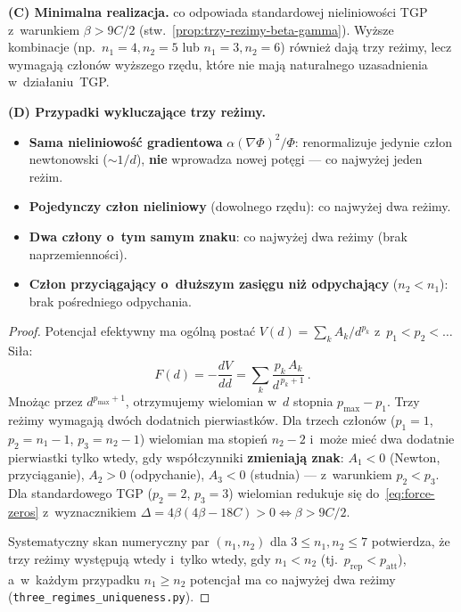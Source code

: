 \begin{theorem}
\medskip
\noindent\textbf{(C) Minimalna realizacja.}
co odpowiada standardowej nieliniowo\'sci TGP z~warunkiem
$\beta > 9C/2$ (stw.~\ref{prop:trzy-rezimy-beta-gamma}).
Wy\.zsze kombinacje (np.\ $n_1{=}4, n_2{=}5$ lub $n_1{=}3, n_2{=}6$)
r\'ownie\.z daj\k{a} trzy re\.zimy, lecz wymagaj\k{a} cz\l{}on\'ow
wy\.zszego rz\k{e}du, kt\'ore nie maj\k{a} naturalnego uzasadnienia
w~dzia\l{}aniu~TGP.

\medskip
\noindent\textbf{(D) Przypadki wykluczaj\k{a}ce trzy re\.zimy.}
\begin{itemize}[nosep]
  \item \textbf{Sama nieliniowo\'s\'c gradientowa}
        $\alpha(\nabla\Phi)^2/\Phi$: renormalizuje jedynie cz\l{}on
        newtonowski ($\sim 1/d$), \textbf{nie} wprowadza nowej pot\k{e}gi
        --- co najwy\.zej jeden re\.zim.
  \item \textbf{Pojedynczy cz\l{}on nieliniowy} (dowolnego rz\k{e}du):
        co najwy\.zej dwa re\.zimy.
  \item \textbf{Dwa cz\l{}ony o~tym samym znaku}: co najwy\.zej dwa
        re\.zimy (brak naprzemienno\'sci).
  \item \textbf{Cz\l{}on przyci\k{a}gaj\k{a}cy o~d\l{}u\.zszym zasi\k{e}gu
        ni\.z odpychaj\k{a}cy} ($n_2 < n_1$): brak po\'sredniego
        odpychania.
\end{itemize}
\end{theorem}

\begin{proof}
Potencja\l{} efektywny ma og\'oln\k{a} posta\'c
$V(d) = \sum_k A_k / d^{p_k}$ z~$p_1 < p_2 < \ldots$
Si\l{}a:
\[
  F(d) = -\frac{dV}{dd}
       = \sum_k \frac{p_k\, A_k}{d^{\,p_k+1}}\,.
\]
Mno\.z\k{a}c przez $d^{p_{\max}+1}$, otrzymujemy wielomian w~$d$
stopnia $p_{\max} - p_1$. Trzy re\.zimy wymagaj\k{a} dw\'och
dodatnich pierwiastk\'ow. Dla trzech cz\l{}on\'ow
($p_1 = 1$, $p_2 = n_1{-}1$, $p_3 = n_2{-}1$) wielomian ma stopie\'n
$n_2{-}2$ i~mo\.ze mie\'c dwa dodatnie pierwiastki tylko wtedy,
gdy wsp\'o\l{}czynniki \textbf{zmieniaj\k{a} znak}: $A_1 < 0$
(Newton, przyci\k{a}ganie), $A_2 > 0$ (odpychanie),
$A_3 < 0$ (studnia) --- z~warunkiem $p_2 < p_3$.
Dla standardowego TGP ($p_2 = 2$, $p_3 = 3$) wielomian redukuje
si\k{e} do~\eqref{eq:force-zeros} z~wyznacznikiem
$\Delta = 4\beta(4\beta - 18C) > 0 \iff \beta > 9C/2$.

Systematyczny skan numeryczny par $(n_1, n_2)$ dla
$3 \leq n_1, n_2 \leq 7$ potwierdza, \.ze trzy re\.zimy
wyst\k{e}puj\k{a} wtedy i~tylko wtedy, gdy $n_1 < n_2$
(tj.\ $p_{\mathrm{rep}} < p_{\mathrm{att}}$), a~w~ka\.zdym przypadku
$n_1 \geq n_2$ potencja\l{} ma co najwy\.zej dwa re\.zimy
(\texttt{three\_regimes\_uniqueness.py}).
\end{proof}

